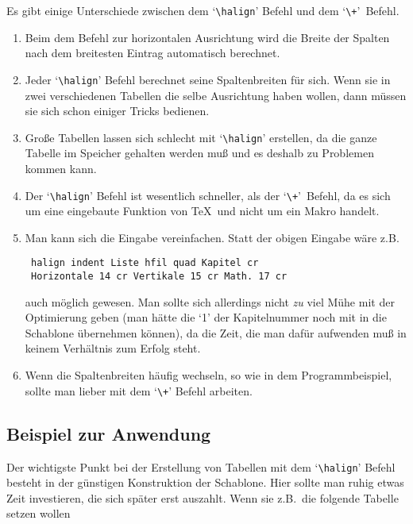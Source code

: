 Es gibt einige Unterschiede zwischen dem
`\verb|\halign|' Befehl und
dem `\verb|\+|'~Befehl.
\begin{enumerate}
\item Beim dem Befehl zur horizontalen Ausrichtung wird die Breite der
Spalten nach dem breitesten Eintrag automatisch berechnet.
\item Jeder `\verb|\halign|' Befehl berechnet seine Spaltenbreiten f\"ur
sich. Wenn sie in zwei verschiedenen Tabellen die selbe Ausrichtung
haben wollen, dann m\"ussen sie sich schon einiger Tricks bedienen.
\item Gro\ss{}e Tabellen lassen sich schlecht mit `\verb|\halign|'
erstellen, da die ganze Tabelle im 
Speicher gehalten werden mu\ss{} und es
deshalb zu Problemen kommen kann.
\item Der `\verb|\halign|' Befehl ist wesentlich schneller, als der
`\verb|\+|'~Befehl, da es sich um eine eingebaute Funktion von \TeX\
und nicht um ein Makro handelt.
\item Man kann sich die Eingabe vereinfachen. Statt der obigen Eingabe
w\"are z.B.

\medskip
{\tt{} halign indent\ Liste
hfil quad Kapitel \char35\char92 cr}\\{\tt
Horizontale 14 cr Vertikale\char38 15\char92 cr
Math.\char38 17\char92 cr}\medskip

auch m\"oglich gewesen. Man sollte sich allerdings nicht {\em zu} viel
M\"uhe mit der \index{Optimierung}Optimierung geben (man h\"atte die `1' der
\index{Kapitel!Nummer}Kapitelnummer
noch mit in die 
Schablone \"ubernehmen k\"onnen), da die Zeit, die man
daf\"ur aufwenden mu\ss{} in keinem Verh\"altnis zum Erfolg steht.
\item Wenn die Spaltenbreiten h\"aufig wechseln, so wie in dem
Programmbeispiel, sollte man lieber mit dem `\verb|\+|' Befehl
arbeiten.
\end{enumerate}
\subsection{Beispiel zur Anwendung}
Der wichtigste Punkt bei der Erstellung von Tabellen mit dem
`\verb|\halign|' Befehl besteht in der g\"unstigen Konstruktion der
\index{Schablone}
Schablone. Hier sollte man ruhig etwas Zeit investieren, die sich
sp\"ater erst auszahlt. Wenn sie z.B.\ die folgende Tabelle setzen
wollen


